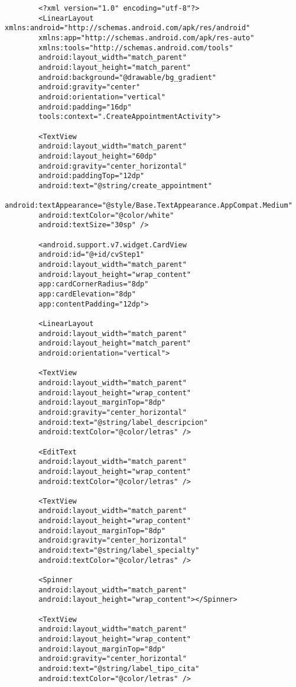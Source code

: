 \documentclass[a4paper]{article}
\begin{document}
	\begin{lstlisting}
		<?xml version="1.0" encoding="utf-8"?>
		<LinearLayout xmlns:android="http://schemas.android.com/apk/res/android"
		xmlns:app="http://schemas.android.com/apk/res-auto"
		xmlns:tools="http://schemas.android.com/tools"
		android:layout_width="match_parent"
		android:layout_height="match_parent"
		android:background="@drawable/bg_gradient"
		android:gravity="center"
		android:orientation="vertical"
		android:padding="16dp"
		tools:context=".CreateAppointmentActivity">
		
		<TextView
		android:layout_width="match_parent"
		android:layout_height="60dp"
		android:gravity="center_horizontal"
		android:paddingTop="12dp"
		android:text="@string/create_appointment"
		android:textAppearance="@style/Base.TextAppearance.AppCompat.Medium"
		android:textColor="@color/white"
		android:textSize="30sp" />
		
		<android.support.v7.widget.CardView
		android:id="@+id/cvStep1"
		android:layout_width="match_parent"
		android:layout_height="wrap_content"
		app:cardCornerRadius="8dp"
		app:cardElevation="8dp"
		app:contentPadding="12dp">
		
		<LinearLayout
		android:layout_width="match_parent"
		android:layout_height="match_parent"
		android:orientation="vertical">
		
		<TextView
		android:layout_width="match_parent"
		android:layout_height="wrap_content"
		android:layout_marginTop="8dp"
		android:gravity="center_horizontal"
		android:text="@string/label_descripcion"
		android:textColor="@color/letras" />
		
		<EditText
		android:layout_width="match_parent"
		android:layout_height="wrap_content"
		android:textColor="@color/letras" />
		
		<TextView
		android:layout_width="match_parent"
		android:layout_height="wrap_content"
		android:layout_marginTop="8dp"
		android:gravity="center_horizontal"
		android:text="@string/label_specialty"
		android:textColor="@color/letras" />
		
		<Spinner
		android:layout_width="match_parent"
		android:layout_height="wrap_content"></Spinner>
		
		<TextView
		android:layout_width="match_parent"
		android:layout_height="wrap_content"
		android:layout_marginTop="8dp"
		android:gravity="center_horizontal"
		android:text="@string/label_tipo_cita"
		android:textColor="@color/letras" />
		

\end{lstlisting}
\end{document}
